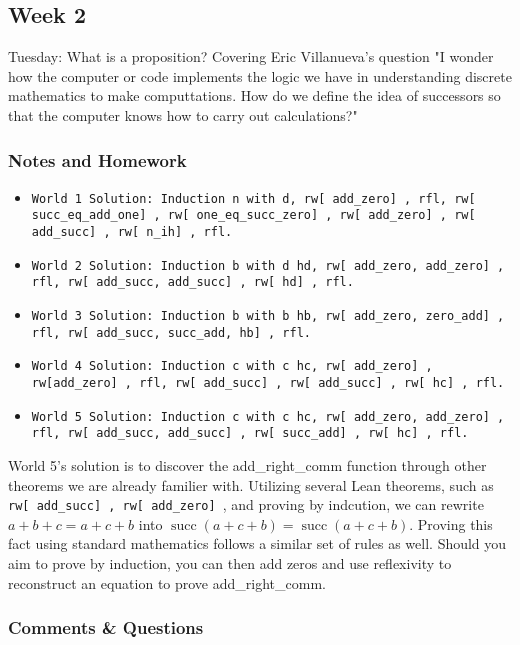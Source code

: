 \documentclass{article}
\DeclareMathOperator{\successor}{succ}
\theoremstyle{theorem}
\theoremstyle{definition}
\theoremstyle{remark}
\begin{document}
\subsection{Week 2}

Tuesday: What is a proposition? Covering Eric Villanueva's question "I wonder how the computer or code implements the logic we have in understanding discrete mathematics to make computtations. How do we define the idea of successors so that the computer knows how to carry out calculations?"

\subsubsection{Notes and Homework}

\begin{itemize}
  \item \texttt{World 1 Solution: Induction n with d, rw[\,add\_zero]\,, rfl, rw[\,succ\_eq\_add\_one]\,, rw[\,one\_eq\_succ\_zero]\,, rw[\,add\_zero]\,, rw[\,add\_succ]\,, rw[\,n\_ih]\,, rfl.}
  \item \texttt{World 2 Solution: Induction b with d hd, rw[\,add\_zero, add\_zero]\,, rfl, rw[\,add\_succ, add\_succ]\,, rw[\,hd]\,, rfl.}
  \item \texttt{World 3 Solution: Induction b with b hb, rw[\,add\_zero, zero\_add]\,, rfl, rw[\,add\_succ, succ\_add, hb]\,, rfl.}
  \item \texttt{World 4 Solution: Induction c with c hc, rw[\,add\_zero]\,, rw[add\_zero]\,, rfl, rw[\,add\_succ]\,, rw[\,add\_succ]\,, rw[\,hc]\,, rfl.}
  \item \texttt{World 5 Solution: Induction c with c hc, rw[\,add\_zero, add\_zero]\,, rfl, rw[\,add\_succ, add\_succ]\,, rw[\,succ\_add]\,, rw[\,hc]\,, rfl.}
\end{itemize}

World 5's solution is to discover the add\_right\_comm function through other theorems we are already familier with. Utilizing several Lean theorems, such as \texttt{rw[\,add\_succ]\,, rw[\,add\_zero]\,}, and proving by indcution, we can rewrite $a+b+c = a+c+b$ into $\successor (a+c+b) = \successor  (a+c+b)$. Proving this fact using standard mathematics follows a similar set of rules as well. Should you aim to prove by induction, you can then add zeros and use reflexivity to reconstruct an equation to prove add\_right\_comm.


\subsubsection{Comments \& Questions}
\end{document}
